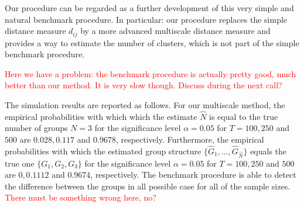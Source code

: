 \documentclass[12pt]{article}
\begin{document}
{Our procedure can be regarded as a further development of this very simple and natural benchmark procedure. In particular: our procedure replaces the simple distance measure $d_{ij}$ by a more advanced multiscale distance measure and provides a way to estimate the number of clusters, which is not part of the simple benchmark procedure.


%
%
%
%
%

\textcolor{red}{Here we have a problem: the benchmark procedure is actually pretty good, much better than our method. It is very slow though. Discuss during the next call?}

The simulation results are reported as follows. For our multiscale method, the empirical probabilities with which which the estimate $\widehat{N}$ is equal to the true number of groups $N = 3$ for the significance level $\alpha=0.05$ for $T=100, 250$ and $500$ are $0.028, 0.117$ and $0.9678$, respectively. Furthermore, the  empirical probabilities with which the estimated group structure $\{ \widehat{G}_1,\ldots,\widehat{G}_{\widehat{N}}\}$ equals the true one $\{G_1,G_2,G_3\}$ for the significance level $\alpha=0.05$ for $T=100, 250$ and $500$ are $0, 0.1112$ and $0.9674$, respectively. The benchmark procedure is able to detect the difference between the groups in all possible case for all of the sample sizes. \textcolor{red}{There must be something wrong here, no?}

}
\end{document}
